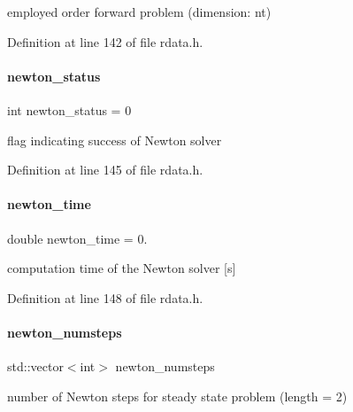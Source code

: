 employed order forward problem (dimension\+: nt) 

Definition at line 142 of file rdata.\+h.

\mbox{\label{classamici_1_1_return_data_a7a12031049f81ccdd4496bd4506c6d28}} 
\paragraph{\texorpdfstring{newton\+\_\+status}{newton\_status}}
{\footnotesize\ttfamily int newton\+\_\+status = 0}

flag indicating success of Newton solver 

Definition at line 145 of file rdata.\+h.

\mbox{\label{classamici_1_1_return_data_a6a66e25a5f5073ee559f22e82e0dee1f}} 
\paragraph{\texorpdfstring{newton\+\_\+time}{newton\_time}}
{\footnotesize\ttfamily double newton\+\_\+time = 0.}

computation time of the Newton solver \mbox{[}s\mbox{]} 

Definition at line 148 of file rdata.\+h.

\mbox{\label{classamici_1_1_return_data_ae8d9136bb7510303556f9935a15b9318}} 
\paragraph{\texorpdfstring{newton\+\_\+numsteps}{newton\_numsteps}}
{\footnotesize\ttfamily std\+::vector$<$int$>$ newton\+\_\+numsteps}

number of Newton steps for steady state problem (length = 2) 

